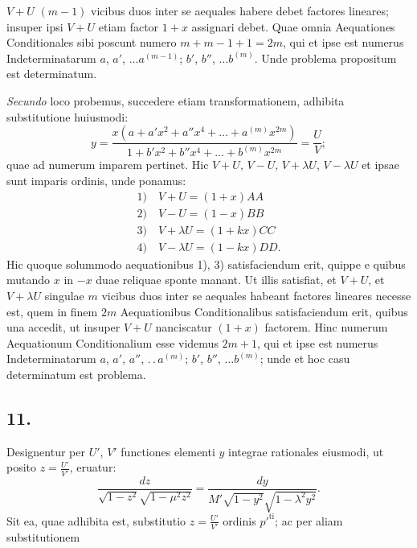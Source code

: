 \documentclass{article}
\begin{document}
$V+U$ $(m-1)$ vicibus duos inter se aequales habere debet factores lineares; insuper ipsi $V+U$ etiam factor $1+x$ assignari debet. Quae omnia Aequationes Conditionales sibi poscunt numero $m+m-1+1=2m$, qui et ipse est numerus Indeterminatarum $a$, $a'$, $\ldots a^{(m-1)}$; $b'$, $b''$, $\ldots b^{(m)}$. Unde problema propositum est determinatum.

\emph{Secundo} loco probemus, succedere etiam transformationem, adhibita substitutione huiusmodi:
\[
y=\frac{x\left(a+a'x^{2}+a''x^{4}+\ldots+a^{(m)}x^{2m}\right)}{1+b'x^{2}+b''x^{4}+\ldots+b^{(m)}x^{2m}}=\frac{U}{V};
\]
quae ad numerum imparem pertinet. Hic $V+U$, $V-U$, $V+\lambda U$, $V-\lambda U$ et ipsae sunt imparis ordinis, unde ponamus:
\[
\begin{gathered}
\text{1)}\quad V+U=(1+x)AA\\
\text{2)}\quad V-U=(1-x)BB\\
\text{3)}\quad V+\lambda U=(1+kx)CC\\
\text{4)}\quad V-\lambda U=(1-kx)DD.
\end{gathered}
\]
Hic quoque solummodo aequationibus 1), 3) satisfaciendum erit, quippe e quibus mutando $x$ in $-x$ duae reliquae sponte manant. Ut illis satisfiat, et $V+U$, et $V+\lambda U$ singulae $m$ vicibus duos inter se aequales habeant factores lineares necesse est, quem in finem $2m$ Aequationibus Conditionalibus satisfaciendum erit, quibus una accedit, ut insuper $V+U$ nanciscatur $(1+x)$ factorem. Hinc numerum Aequationum Conditionalium esse videmus $2m+1$, qui et ipse est numerus Indeterminatarum $a$, $a'$, $a''$, $.\,.\,a^{(m)}$; $b'$, $b''$, $\ldots b^{(m)}$; unde et hoc casu determinatum est problema.

\subsection*{11.}

Designentur per $U'$, $V'$ functiones elementi $y$ integrae rationales eiusmodi, ut posito $z=\frac{U'}{V'}$, eruatur:
\[
\frac{dz}{\sqrt{1-z^{2}}\sqrt{1-\mu^{2}z^{2}}}=\frac{dy}{M'\sqrt{1-y^{2}}\sqrt{1-\lambda^{2}y^{2}}}.
\]
Sit ea, quae adhibita est, substitutio $z=\frac{U'}{V'}$ ordinis $p'^{\mathrm{ti}}$; ac per aliam substitutionem
\end{document}
